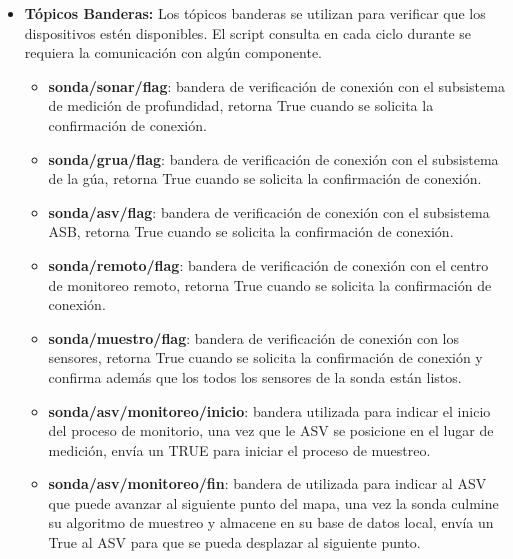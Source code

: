 \begin{itemize}
    \item \textbf{T\'opicos Banderas:} Los t\'opicos banderas se utilizan para verificar que los dispositivos est\'en disponibles. El script consulta en cada ciclo durante se requiera la comunicaci\'on con alg\'un componente.
    \begin{itemize}
        \item \textbf{sonda/sonar/flag}: bandera de verificaci\'on de conexi\'on con el subsistema de medici\'on de profundidad, retorna True cuando se solicita la confirmaci\'on de conexi\'on.
        \item \textbf{sonda/grua/flag}: bandera de verificaci\'on de conexi\'on con el subsistema de la g\'ua, retorna True cuando se solicita la confirmaci\'on de conexi\'on.
        \item \textbf{sonda/asv/flag}: bandera de verificaci\'on de conexi\'on con el subsistema ASB, retorna True cuando se solicita la confirmaci\'on de conexi\'on.
        \item \textbf{sonda/remoto/flag}: bandera de verificaci\'on de conexi\'on con el centro de monitoreo remoto, retorna True cuando se solicita la confirmaci\'on de conexi\'on.
        \item \textbf{sonda/muestro/flag}: bandera de verificaci\'on de conexi\'on con los sensores, retorna True cuando se solicita la confirmaci\'on de conexi\'on y confirma adem\'as que los todos los sensores de la sonda están listos.
        \item \textbf{sonda/asv/monitoreo/inicio}: bandera utilizada para indicar el inicio del proceso de monitorio, una vez que le ASV se posicione en el lugar de medici\'on, env\'ia un TRUE para iniciar el proceso de muestreo.
        \item \textbf{sonda/asv/monitoreo/fin}: bandera de utilizada para indicar al ASV que puede avanzar al siguiente punto del mapa, una vez la sonda culmine su algoritmo de muestreo y almacene en su base de datos local, env\'ia un True al ASV para que se pueda desplazar al siguiente punto.



\end{itemize}
\end{itemize}
